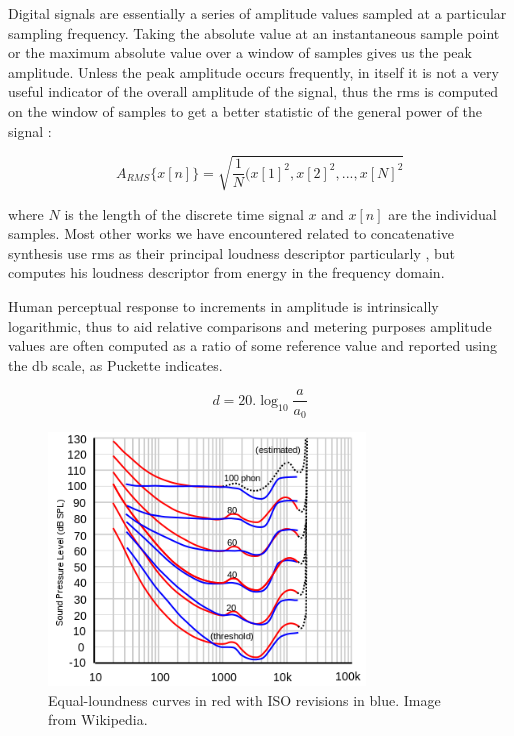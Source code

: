 {{Digital signals are essentially a series of amplitude values sampled at a particular sampling frequency. Taking the absolute value at an instantaneous sample point or the maximum absolute value over a window of samples gives us the peak amplitude. Unless the peak amplitude occurs frequently, in itself it is not a very useful indicator of the overall amplitude of the signal, thus the \acrfull{rms} is computed on the window of samples to get a better statistic of the general power of the signal \citep{Puckette2006}:

\begin{equation}
\label{eq:rms}	
A_{RMS}\{x[n]\} = \sqrt{\frac{1}{N}(x[1]^2, x[2]^2,..., x[N]^2}
\end{equation}

where $N$ is the length of the discrete time signal $x$ and $x[n]$ are the individual samples. Most other works we have encountered related to concatenative synthesis use \acrshort{rms} as their principal loudness descriptor particularly \citep{Sturm2004, Schwarz2006, Bernardes2013}, but \cite{Jehan2005} computes his loudness descriptor from energy in the frequency domain.

Human perceptual response to increments in amplitude is intrinsically logarithmic, thus to aid relative comparisons and metering purposes amplitude values are often computed as a ratio of some reference value and reported using the \acrfull{db} scale, as Puckette \citeyearpar{Puckette2006} indicates. 

\begin{equation}
\label{eq:decibel}	
d = 20.\log_{10}{\frac{a}{a_{0}}}
\end{equation}

\begin{figure}
	\begin{center}
		\includegraphics[width=0.75\textwidth]{ch05_pyconcat/figures/fletcher_munson.png}
	\end{center}
	\caption[Fletcher-Munson Curves]{Equal-loundness curves in red with ISO revisions in blue. Image from Wikipedia.}
	\label{fig:fletcher}
\end{figure}

}}
